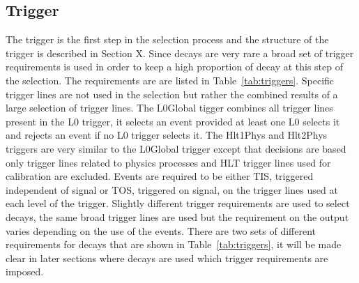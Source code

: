 \subsection{Trigger}
\label{sec:triggerRequirements}
The trigger is the first step in the selection process and the structure of the trigger is described in Section X. Since \bsmumu decays are very rare a broad set of trigger requirements is used in order to keep a high proportion of \bsmumu decay at this step of the selection. The requirements are are listed in Table~\ref{tab:triggers}.  Specific trigger lines are not used in the selection but rather the combined results of a large selection of trigger lines. The L0Global tigger combines all trigger lines present in the L0 trigger, it selects an event provided at least one L0 selects it and rejects an event if no L0 trigger selects it. The Hlt1Phys and Hlt2Phys triggers are very similar to the L0Global trigger except that decisions are based only trigger lines related to physics processes and HLT trigger lines used for calibration are excluded. Events are required to be either TIS, triggered independent of signal or TOS, triggered on signal, on the trigger lines used at each level of the trigger.
Slightly different trigger requirements are used to select \bhh decays, the same broad trigger lines are used but the requirement on the output varies depending on the use of the \bhh events. There are two sets of different requirements for \bhh decays that are shown in Table~\ref{tab:triggers}, it will be made clear in later sections where \bhh decays are used which trigger requirements are imposed. 




